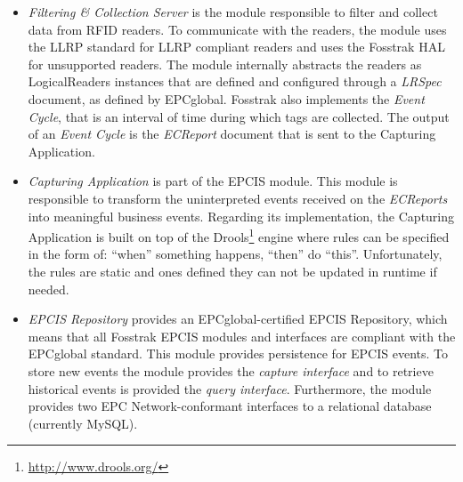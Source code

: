 \begin{itemize}
  \item \textit{Filtering \& Collection Server} is the module responsible to filter and collect data
  from \gls{RFID} readers. To communicate with the readers, the module uses the \gls{LLRP} standard
  for \gls{LLRP} compliant readers and uses the Fosstrak \gls{HAL} for unsupported readers. The
  module internally abstracts the readers as LogicalReaders instances that are defined and configured
  through a \textit{LRSpec} document, as defined by EPCglobal. Fosstrak also implements the
  \textit{Event Cycle}, that is an interval of time during which tags are collected. The output of
  an \textit{Event Cycle} is the \textit{ECReport} document that is sent to the Capturing Application.
  \item \textit{Capturing Application} is part of the EPCIS module. This module is responsible to
  transform the uninterpreted events received on the \textit{ECReports} into meaningful business events.
  Regarding its implementation, the Capturing Application is built on top of the Drools\footnote{\url{http://www.drools.org/}}
  engine where rules can be specified in the form of: ``when'' something happens, ``then'' do ``this''.
  Unfortunately, the rules are static and ones defined they can not be updated in runtime if needed.
  \item \textit{EPCIS Repository} provides an EPCglobal-certified EPCIS Repository, which means that
  all Fosstrak EPCIS modules and interfaces are compliant with the EPCglobal standard. This module
  provides persistence for \gls{EPCIS} events. To store new events the module provides the
  \textit{capture interface} and to retrieve historical events is provided the \textit{query interface}.
  Furthermore, the module provides two EPC Network-conformant interfaces to a relational database
  (currently MySQL).
\end{itemize}
